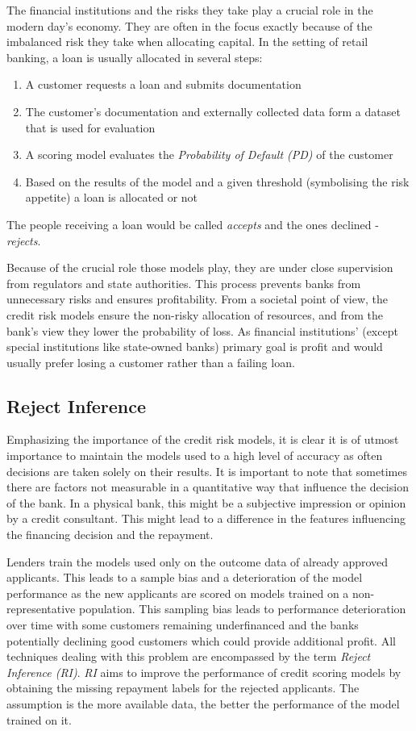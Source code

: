 \documentclass[11pt,a4paper]{article}
\begin{document}
The financial institutions and the risks they take play a crucial role in the modern day's economy. They are often in the focus exactly because of the imbalanced risk they take when allocating capital. In the setting of retail banking, a loan is usually allocated in several steps: 

\begin{enumerate}
  \item A customer requests a loan and submits documentation
  \item The customer's documentation and externally collected data form a dataset that is used for evaluation
  \item A scoring model evaluates the \textit{Probability of Default (PD)} of the customer
  \item Based on the results of the model and a given threshold (symbolising the risk appetite) a loan is allocated or not
\end{enumerate}

The people receiving a loan would be called \textit{accepts} and the ones declined - \textit{rejects}.

Because of the crucial role those models play, they are under close supervision from regulators and state authorities. This process prevents banks from unnecessary risks and ensures profitability. From a societal point of view, the credit risk models ensure the non-risky allocation of resources, and from the bank's view they lower the probability of loss. 
As financial institutions' (except special institutions like state-owned banks) primary goal is profit and would usually prefer losing a customer rather than a failing loan. 

\subsection{Reject Inference}

Emphasizing the importance of the credit risk models, it is clear it is of utmost importance to maintain the models used to a high level of accuracy as often decisions are taken solely on their results. It is important to note that sometimes there are factors not measurable in a quantitative way that influence the decision of the bank. In a physical bank, this might be a subjective impression or opinion by a credit consultant. This might lead to a difference in the features influencing the financing decision and the repayment.

Lenders train the models used only on the outcome data of already approved applicants. This leads to a sample bias and a deterioration of the model performance as the new applicants are scored on models trained on a non-representative population. This sampling bias leads to performance deterioration over time with some customers remaining underfinanced and the banks potentially declining good customers which could provide additional profit. All techniques dealing with this problem are encompassed by the term \textit{Reject Inference (RI)}. 
\textit{RI} aims to improve the performance of credit scoring models by obtaining the missing repayment labels for the rejected applicants. The assumption is the more available data, the better the performance of the model trained on it. 
\end{document}
